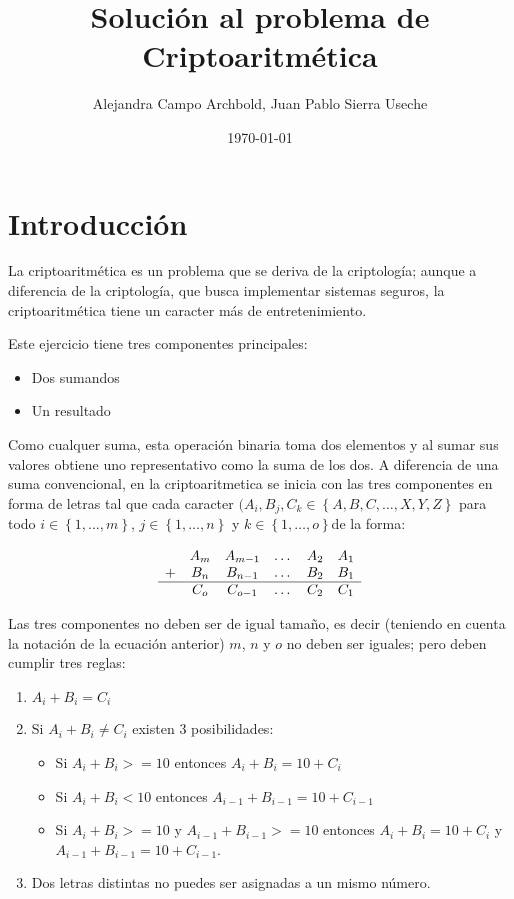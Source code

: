 \documentclass[11pt]{article}
\author{Alejandra Campo Archbold, Juan Pablo Sierra Useche}
\date{\today}
\title{Solución al problema de Criptoaritmética}
\begin{document}
\maketitle
\tableofcontents


\section{Introducción}
\label{sec:orgc3bba92}

La criptoaritmética es un problema que se deriva de la criptología; aunque a
diferencia de la criptología, que busca implementar sistemas seguros, la
criptoaritmética tiene un caracter más de entretenimiento.

Este ejercicio tiene tres componentes principales:

\begin{itemize}
\item Dos sumandos
\item Un resultado
\end{itemize}

Como cualquer suma, esta operación binaria toma dos elementos y al sumar sus
valores obtiene uno representativo como la suma de los dos. A diferencia de una
suma convencional, en la criptoaritmetica se inicia con las tres componentes  en
forma de letras tal que cada caracter \((A_i,B_j,C_k \in \left\{ A,B,C,\dots,X,Y,Z
\right\}\) para
todo \(i \in \left\{ 1,\dots,m \right\}\), \(j\in
\left\{1,\dots,n\right\}\) y  \(k\in \left\{1,\dots,o\right\}\)de la forma:

\begin{align*}
\begin{matrix}
&A_m&A_{m-1}&\dots&A_2&A_1\\
+&B_n&B_{n-1}&\dots&B_2&B_1\\
\hline
&C_o&C_{o-1}&\dots&C_2&C_1\\
\end{matrix}
\end{align*}

Las tres componentes no deben ser de igual tamaño, es decir (teniendo en cuenta
la notación de la ecuación anterior) \(m\), \(n\) y \(o\) no deben ser iguales;
pero deben cumplir tres reglas:

\begin{enumerate}
\item \(A_i + B_i = C_i\)
\item Si \(A_i + B_i \ne C_i\) existen 3 posibilidades:
\begin{itemize}
\item Si \(A_i + B_i >= 10\) entonces \(A_i + B_i = 10 + C_i\)
\item Si \(A_i + B_i < 10\) entonces \(A_{i-1} + B_{i-1} = 10 + C_{i-1}\)
\item Si \(A_i + B_i >= 10\) y \(A_{i-1} + B_{i-1} >= 10\) entonces \(A_i + B_i = 10 + C_i\) y \(A_{i-1} + B_{i-1} = 10 + C_{i-1}\).
\end{itemize}
\item Dos letras distintas no puedes ser asignadas a un mismo número.
\end{enumerate}
\end{document}
